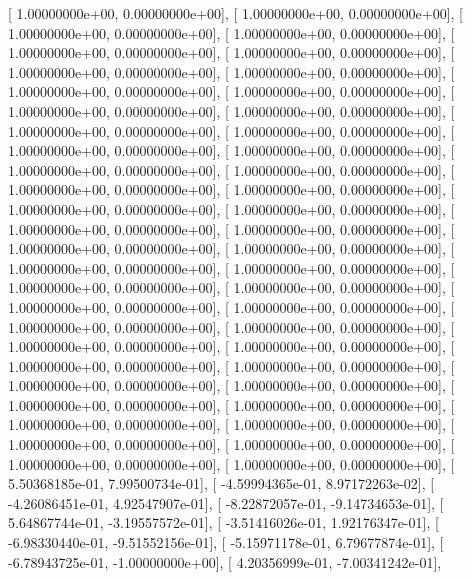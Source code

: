 \documentclass{article}
\begin{document}
       [  1.00000000e+00,   0.00000000e+00],
       [  1.00000000e+00,   0.00000000e+00],
       [  1.00000000e+00,   0.00000000e+00],
       [  1.00000000e+00,   0.00000000e+00],
       [  1.00000000e+00,   0.00000000e+00],
       [  1.00000000e+00,   0.00000000e+00],
       [  1.00000000e+00,   0.00000000e+00],
       [  1.00000000e+00,   0.00000000e+00],
       [  1.00000000e+00,   0.00000000e+00],
       [  1.00000000e+00,   0.00000000e+00],
       [  1.00000000e+00,   0.00000000e+00],
       [  1.00000000e+00,   0.00000000e+00],
       [  1.00000000e+00,   0.00000000e+00],
       [  1.00000000e+00,   0.00000000e+00],
       [  1.00000000e+00,   0.00000000e+00],
       [  1.00000000e+00,   0.00000000e+00],
       [  1.00000000e+00,   0.00000000e+00],
       [  1.00000000e+00,   0.00000000e+00],
       [  1.00000000e+00,   0.00000000e+00],
       [  1.00000000e+00,   0.00000000e+00],
       [  1.00000000e+00,   0.00000000e+00],
       [  1.00000000e+00,   0.00000000e+00],
       [  1.00000000e+00,   0.00000000e+00],
       [  1.00000000e+00,   0.00000000e+00],
       [  1.00000000e+00,   0.00000000e+00],
       [  1.00000000e+00,   0.00000000e+00],
       [  1.00000000e+00,   0.00000000e+00],
       [  1.00000000e+00,   0.00000000e+00],
       [  1.00000000e+00,   0.00000000e+00],
       [  1.00000000e+00,   0.00000000e+00],
       [  1.00000000e+00,   0.00000000e+00],
       [  1.00000000e+00,   0.00000000e+00],
       [  1.00000000e+00,   0.00000000e+00],
       [  1.00000000e+00,   0.00000000e+00],
       [  1.00000000e+00,   0.00000000e+00],
       [  1.00000000e+00,   0.00000000e+00],
       [  1.00000000e+00,   0.00000000e+00],
       [  1.00000000e+00,   0.00000000e+00],
       [  1.00000000e+00,   0.00000000e+00],
       [  1.00000000e+00,   0.00000000e+00],
       [  1.00000000e+00,   0.00000000e+00],
       [  1.00000000e+00,   0.00000000e+00],
       [  1.00000000e+00,   0.00000000e+00],
       [  1.00000000e+00,   0.00000000e+00],
       [  1.00000000e+00,   0.00000000e+00],
       [  1.00000000e+00,   0.00000000e+00],
       [  1.00000000e+00,   0.00000000e+00],
       [  1.00000000e+00,   0.00000000e+00],
       [  5.50368185e-01,   7.99500734e-01],
       [ -4.59994365e-01,   8.97172263e-02],
       [ -4.26086451e-01,   4.92547907e-01],
       [ -8.22872057e-01,  -9.14734653e-01],
       [  5.64867744e-01,  -3.19557572e-01],
       [ -3.51416026e-01,   1.92176347e-01],
       [ -6.98330440e-01,  -9.51552156e-01],
       [ -5.15971178e-01,   6.79677874e-01],
       [ -6.78943725e-01,  -1.00000000e+00],
       [  4.20356999e-01,  -7.00341242e-01],
\end{document}
